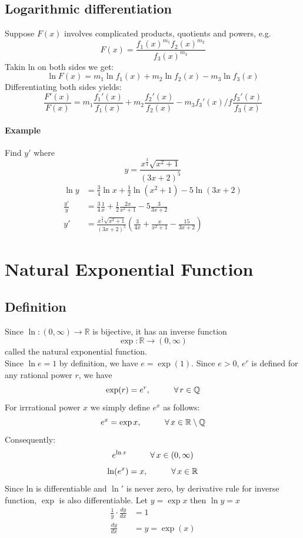 \documentclass[12pt]{article}
\newcommand\tab[1][1cm]{\hspace*{#1}}
\begin{document}
\subsection{Logarithmic differentiation}
Suppose $F(x)$ involves complicated products, quotients and powers, e.g.
\[
    F(x) = \frac{f_1(x)^{m_1}f_2(x)^{m_2}}{f_3(x)^{m_3}} 
\]
Takin ln on both sides we get:
\[
    \ln F(x) = m_1 \ln f_1(x) + m_2 \ln f_2(x) - m_3 \ln f_3(x)
\]
Differentiating both sides yields:
\[
    \frac{F'(x)}{F(x)} = m_1 \frac{f_1'(x)}{f_1(x)} + m_2 \frac{f_2'(x)}{f_2(x)} - m_3 {f_3'(x)}/f\frac{f_3'(x)}{f_3(x)}  
\]

\paragraph{Example} Find $y'$ where 
\[
  y = \frac{x^{\frac{3}{4}}\sqrt{x^2 + 1}}{(3x + 2)^5}
\]
\begin{align*} 
    \ln y &= \frac{3}{4} \ln x + \frac{1}{2} \ln (x^2 + 1) - 5 \ln (3x + 2) \\
    \frac{y'}{y} &= \frac{3}{4} \frac{1}{x} + \frac{1}{2} \frac{2x}{x^2 + 1} - 5 \frac{3}{3x + 2} \\
    y' &= \frac{x^{\frac{3}{4}}\sqrt{x^2 + 1}}{(3x + 2)^5} \left( \frac{3}{4x} + \frac{x}{x^2 + 1} - \frac{15}{3x + 2}  \right)
\end{align*}
\section{Natural Exponential Function}
\subsection{Definition}
Since $\ln : (0, \infty) \to \mathbb{R}$ is bijective, it has an inverse function
\[
    \exp : \mathbb{R} \to (0, \infty)
\]
called the natural exponential function. \\
Since $\ln e = 1$ by definition, we have $e = \exp(1)$.
Since $e > 0$, $e^r$ is defined for any rational power $r$, we have
\[
    \exp(r) = e^r, \textrm{\tab} \forall \, r \in \mathbb{Q}
\]
For irrrational power $x$ we simply define $e^x$ as follows:
\[
    e^x = \exp{x}, \textrm{\tab} \forall \, x \in \mathbb{R} \setminus \mathbb{Q}
\]
Consequently:
\[
    e^{\ln x} \textrm{\tab} \forall \, x \in (0, \infty)
\]
\[
    \ln (e^x) = x , \textrm{\tab} \forall \, x \in \mathbb{R}
\]
Since ln is differentiable and $\ln'$ is never zero, by derivative rule for inverse function,
$\exp$ is also differentiable. Let $y = \exp{x}$ then $\ln y = x$
\begin{align*} 
    \frac{1}{y} \cdot \frac{dy}{dx} &= 1 \\
    \frac{dy}{dx} &= y = \exp (x)
\end{align*}
\end{document}
